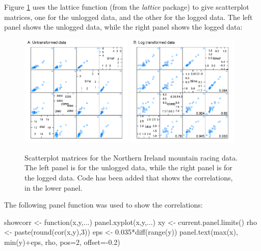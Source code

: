 Figure \ref{fig:nimra} uses the lattice function
 (from the {\em lattice} package) to give scatterplot
matrices, one for the unlogged data, and the other for the logged
data.  The left panel shows the unlogged data, while the right panel
shows the logged data:
\begin{figure}
\vspace*{-6pt}
\begin{Schunk}


\centerline{\includegraphics[width=0.48\textwidth]{figs/05-nihills-spmAB-1} \includegraphics[width=0.48\textwidth]{figs/05-nihills-spmAB-2} }

\end{Schunk}
\caption{Scatterplot matrices for the Northern Ireland mountain racing
  data. The left panel is for the unlogged data, while the right panel is
for the logged data.  Code has been added that shows the correlations,
in the lower panel.\label{fig:nimra}}
\end{figure}
\vspace*{15pt}

The following panel function was used to show the correlations:
\begin{Schunk}
\begin{Sinput}
showcorr <- function(x,y,...){
    panel.xyplot(x,y,...)
    xy <- current.panel.limits()
    rho <- paste(round(cor(x,y),3))
    eps <- 0.035*diff(range(y))
    panel.text(max(x), min(y)+eps, rho,
               pos=2, offset=-0.2)
}
\end{Sinput}
\end{Schunk}

